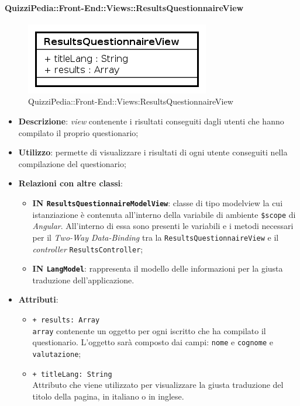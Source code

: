 \paragraph{QuizziPedia::Front-End::Views::ResultsQuestionnaireView}
\begin{figure} [ht]
	\centering
	\includegraphics[scale=0.80]{UML/Classi/Front-End/QuizziPedia_Front-end_ResultsQuestionnarieView.png}
	\caption{QuizziPedia::Front-End::Views:ResultsQuestionnaireView}
\end{figure} \FloatBarrier
\begin{itemize}
	\item \textbf{Descrizione}: \textit{view} contenente i risultati conseguiti dagli utenti che hanno compilato il proprio questionario;
	\item \textbf{Utilizzo}: permette di visualizzare i risultati di ogni utente conseguiti nella compilazione del questionario;
	\item \textbf{Relazioni con altre classi}:
	\begin{itemize}
		\item \textbf{IN \texttt{ResultsQuestionnaireModelView}}: classe di tipo modelview la cui istanziazione è contenuta all'interno della variabile di ambiente \texttt{\$scope} di \textit{Angular}. All'interno di essa sono presenti le variabili e i metodi necessari per il \textit{Two-Way Data-Binding} tra la  \texttt{ResultsQuestionnaireView} e il \textit{controller} \texttt{ResultsController}; 
		\item \textbf{IN \texttt{LangModel}}: rappresenta il modello delle informazioni per la giusta traduzione dell'applicazione.
	\end{itemize}
	\item \textbf{Attributi}:
	\begin{itemize}
		\item \texttt{+ results: Array} \\ \texttt{array} contenente un oggetto per ogni iscritto che ha compilato il questionario. L'oggetto sarà composto dai campi: \texttt{nome} e \texttt{cognome} e \texttt{valutazione};
		\item \texttt{+ titleLang: String} \\ Attributo che viene utilizzato per visualizzare la giusta traduzione del titolo della pagina, in italiano o in inglese.
	\end{itemize}
\end{itemize}
